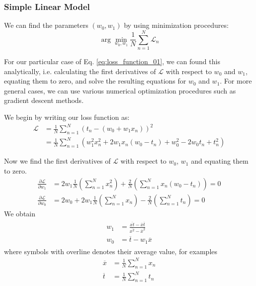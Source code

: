 \documentclass[english,10pt,aspectratio=169,fleqn]{beamer}
\begin{document}
\begin{frame} %
\frametitle{Simple Linear Model}

We can find the parameters $(w_{0},w_{1})$ by using minimization procedures:
\begin{equation}
\arg\min_{w_{0},w_{1}} \frac{1}{N} \sum_{n=1}^{N} \mathcal{L}_{n}
\end{equation}

For our particular case of Eq. \eqref{eq:loss_function_01}, we can found this analytically,
i.e. calculating the first derivatives of $\mathcal{L}$ with respect to $w_0$ and $w_1$, equating
them to zero, and solve the resulting equations for $w_0$ and $w_1$.
For more general cases, we can use various numerical optimization procedures such as
gradient descent methods.

We begin by writing our loss function as:
\begin{align*}
\mathcal{L} & = \frac{1}{N} \sum_{n=1}^{N} \left( t_n - (w_0 + w_1 x_{n}) \right)^2 \\
& = \frac{1}{N} \sum_{n=1}^{N} \left( w_1^2 x_n^2 + 2w_{1}x_{n}(w_0 - t_n) + w_0^2 - 2w_0 t_n + t_n^2 \right)
\end{align*}
\end{frame} %


\begin{frame}
  Now we find the first derivatives of $\mathcal{L}$ with respect to
  $w_0$, $w_1$ and equating them to zero.
  \begin{align*}
  \frac{\partial\mathcal{L}}{\partial w_1} & = 2w_1 \frac{1}{N} \left( \sum_{n=1}^{N} x_n^2 \right) +
  \frac{2}{N} \left( \sum_{n=1}^{N} x_{n} (w_0 - t_n) \right) = 0 \\
  \frac{\partial \mathcal{L}}{\partial w_0} & = 2w_0 + 2w_1 \frac{1}{N} \left( \sum_{n=1}^{N} x_n \right) -
  \frac{2}{N} \left( \sum_{n=1}^{N} t_n \right) = 0
  \end{align*}
  We obtain
  \begin{align}
  \begin{split}
  w_{1} & = \frac{\overline{xt} - \overline{x}\overline{t}}{\overline{x^2} - \overline{x}^2} \\
  w_{0} & = \overline{t} - w_{1} \overline{x}
  \end{split}
  \label{eq:w0_w1_simple}
  \end{align}
  where symbols with overline denotes their average value, for examples
  \begin{align*}
  \overline{x} & = \frac{1}{N} \sum_{n=1}^{N} x_{n} \\
  \overline{t} & = \frac{1}{N} \sum_{n=1}^{N} t_{n}
  \end{align*}
\end{frame}
\end{document}
